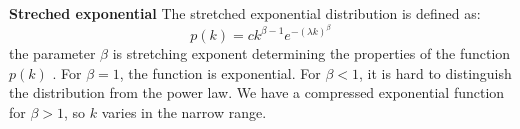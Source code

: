 \textbf{Streched exponential} The stretched exponential distribution is defined as:
\begin{equation}
p(k) = c k^{\beta - 1}e^{-(\lambda k)^{\beta}}
\end{equation}
the parameter $\beta$ is stretching exponent determining the properties of the function $p(k)$ \cite{barabasi2016network}. For $\beta=1$, the function is exponential. For $\beta<1$, it is hard to distinguish the distribution from the power law. We have a compressed exponential function for $\beta>1$, so $k$ varies in the narrow range. 



